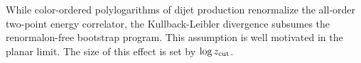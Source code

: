 While color-ordered polylogarithms of dijet production renormalize the
all-order two-point energy correlator, the Kullback-Leibler divergence
subsumes the renormalon-free bootstrap program. This assumption is well
motivated in the planar limit. The size of this effect is set by $\log
z_{\rm cut}$.

